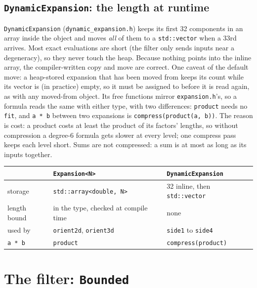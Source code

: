\documentclass[11pt,a4paper]{article}
\newcommand{\code}[1]{\texttt{#1}}
\theoremstyle{definition}
\theoremstyle{remark}
\begin{document}
\subsection{\texorpdfstring{\code{DynamicExpansion}}{DynamicExpansion}: the length at runtime}

\code{DynamicExpansion} (\code{dynamic\_expansion.h}) keeps its first 32 components in an array
inside the object and moves \emph{all} of them to a \code{std::vector} when a 33rd arrives. Most
exact evaluations are short (the filter only sends inputs near a degeneracy), so they never touch
the heap. Because nothing points into the inline array, the compiler-written copy and move are
correct. One caveat of the default move: a heap-stored expansion that has been moved from keeps its
count while its vector is (in practice) empty, so it must be assigned to before it is read again,
as with any moved-from object. Its free functions mirror \code{expansion.h}'s, so a formula reads the same with either
type, with two differences: \code{product} needs no \code{fit}, and \code{a * b} between two
expansions is \code{compress(product(a, b))}. The reason is cost: a product costs at least the
product of its factors' lengths, so without compression a degree-6 formula gets slower at every
level; one compress pass keeps each level short. Sums are not compressed: a sum is at most as long
as its inputs together.

\begin{center}
\begin{tabular}{@{}lll@{}}
  \toprule
  & \code{Expansion<N>} & \code{DynamicExpansion} \\
  \midrule
  storage & \code{std::array<double, N>} & 32 inline, then \code{std::vector} \\
  length bound & in the type, checked at compile time & none \\
  used by & \code{orient2d}, \code{orient3d} & \code{side1} to \code{side4} \\
  \code{a * b} & \code{product} & \code{compress(product)} \\
  \bottomrule
\end{tabular}
\end{center}

\section{The filter: \texorpdfstring{\code{Bounded}}{Bounded}}\label{sec:filter}
\end{document}
